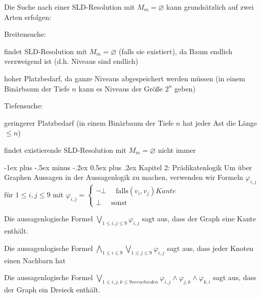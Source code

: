 \documentclass[a4paper]{article}
\makeatletter
\renewcommand{\section}{\@startsection{section}{1}{0mm}%
                {-1ex plus -.5ex minus -.2ex}%
                {0.5ex plus .2ex}%
                {\normalfont\large\bfseries}}
\makeatother
\begin{document}
\begin{multicols}{3}
  Die Suche nach einer SLD-Resolution mit $M_m=\varnothing$ kann grundsätzlich auf zwei Arten erfolgen:
  \begin{itemize*}
    \item Breitensuche:
    \begin{itemize*}
      \item findet SLD-Resolution mit $M_m=\varnothing$ (falls sie existiert), da Baum endlich verzweigend ist (d.h. Niveaus sind endlich)
      \item hoher Platzbedarf, da ganze Niveaus abgespeichert werden müssen (in einem Binärbaum der Tiefe $n$ kann es Niveaus der Größe $2^n$ geben)
    \end{itemize*}
    \item Tiefensuche:
    \begin{itemize*}
      \item geringerer Platzbedarf (in einem Binärbaum der Tiefe $n$ hat jeder Ast die Länge $\leq n$)
      \item findet existierende SLD-Resolution mit $M_m=\varnothing$ nicht immer
    \end{itemize*}
  \end{itemize*}

  \section{Kapitel 2: Prädikatenlogik}
  Um über Graphen Aussagen in der Aussagenlogik zu machen, verwenden wir Formeln $\varphi_{i,j}$ für $1\leq i,j\leq 9$ mit $\varphi_{i,j}=\begin{cases} \lnot\bot\quad\text{ falls} (v_i,v_j) Kante\\ \bot\quad\text{ sonst}\end{cases}$
  \begin{itemize*}
    \item Die aussagenlogische Formel $\bigvee_{1\leq i,j\leq 9} \varphi_{i,j}$ sagt aus, dass der Graph eine Kante enthält.
    \item Die aussagenlogische Formel $\bigwedge_{1\leq i\leq 9} \bigvee_{1\leq j\leq 9} \varphi_{i,j}$ sagt aus, dass jeder Knoten einen Nachbarn hat
    \item Die aussagenlogische Formel $\bigvee_{1\leq i,j,k\leq 9 verschieden} \varphi_{i,j}\wedge\varphi_{j,k}\wedge\varphi_{k,i}$ sagt aus, dass der Graph ein Dreieck enthält.
  \end{itemize*}


\end{multicols}
\end{document}
